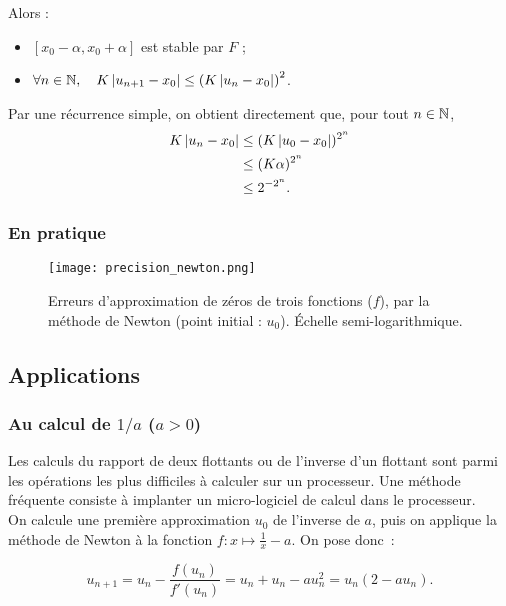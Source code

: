 Alors :
\begin{itemize}
\item $[x_{0}-\alpha, x_{0}+\alpha]$ est stable par $F$ ;
\item $\forall n\in\mathbb{N},\quad K\left|u_{n+1}-x_{0}\right|\leq \left(K\left|u_{n}-x_{0}\right|\right)^{2}$.
\end{itemize}
Par une récurrence simple, on obtient directement que, pour tout $n\in \mathbb{N}$,
\begin{align*}
  K\left|u_{n}-x_{0}\right|&\leq  (K\left|u_{0}-x_{0}\right|)^{2^{n}}\\
                    &\leq (K\alpha)^{2^n}\\
                    &\leq 2^{-2^{n}}.
\end{align*}

\subsubsection{En pratique}
\begin{figure}[!h]
\begin{center}
  \texttt{[image: precision\_newton.png]}
  \caption{Erreurs d'approximation de zéros de trois fonctions ($f$), par la méthode de Newton (point initial : $u_0$). Échelle semi-logarithmique.}
\end{center}
\end{figure}
\subsection{Applications}
\subsubsection{Au calcul de $1/a$ ($a>0$)}

Les calculs du rapport de deux flottants ou de l'inverse d'un flottant sont parmi les opérations les plus 
difficiles à calculer sur un processeur. Une méthode fréquente consiste à implanter un micro-logiciel de calcul dans le 
processeur.\\

On calcule une première approximation $u_{0}$ de l'inverse de $a$, puis on applique la méthode de Newton à la fonction
$f: x\mapsto \frac{1}{x} - a$. On pose donc~:

\begin{equation*}
  u_{n+1} = u_{n} - \frac{f(u_{n})}{f'(u_{n})}
  = u_{n} + u_{n} - a  u_{n}^{2} = u_{n}(2 - au_{n}).
\end{equation*}

